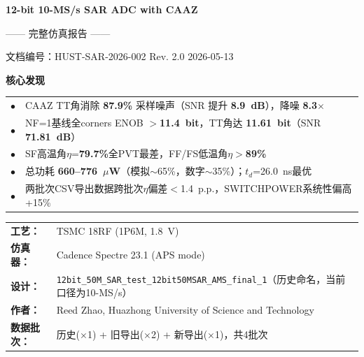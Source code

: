 \documentclass[11pt,a4paper,UTF8]{ctexart}
\begin{document}
\begin{titlepage}
\thispagestyle{empty}
\begin{center}
\vspace*{2cm}

{\LARGE\bfseries\color{primaryblue}12-bit 10-MS/s SAR ADC with CAAZ}

\vspace{0.3cm}
{\large —— 完整仿真报告 ——}

\vspace{1cm}

{\small 文档编号：HUST-SAR-2026-002 \hspace{2em} Rev. 2.0 \hspace{2em} 2026-05-13}

\vspace{1.5cm}

\begin{tcolorbox}[colback=accentblue,colframe=primaryblue,sharp corners]
\centering
\textbf{\large\color{primaryblue}核心发现}
\vspace{4pt}
\small
\begin{tabular}{ll}
\color{primaryblue}$\bullet$ & \color{black}CAAZ TT角消除 \textbf{87.9\%} 采样噪声（SNR 提升 \textbf{8.9~dB}），降噪 \textbf{8.3$\times$} \\
\color{primaryblue}$\bullet$ & \color{black}NF=1基线全corners ENOB $>$\textbf{11.4~bit}，TT角达 \textbf{11.61~bit}（SNR \textbf{71.81~dB}） \\
\color{primaryblue}$\bullet$ & \color{black}SF高温角$\eta$=\textbf{79.7\%}全PVT最差，FF/FS低温角$\eta>$\textbf{89\%} \\
\color{primaryblue}$\bullet$ & \color{black}总功耗 \textbf{660--776~$\mu$W}（模拟$\sim$65\%，数字$\sim$35\%）；$t_d$=26.0~ns最优 \\
\color{primaryblue}$\bullet$ & \color{black}两批次CSV导出数据跨批次$\eta$偏差$<$1.4~p.p.，SWITCHPOWER系统性偏高+15\% \\
\end{tabular}
\end{tcolorbox}

\vspace{1.5cm}

\begin{tabular}{ll}
\textbf{工艺：} & TSMC 18RF (1P6M, 1.8~V) \\
\textbf{仿真器：} & Cadence Spectre 23.1 (APS mode) \\
\textbf{设计：} & \texttt{12bit\_50M\_SAR\_test\_12bit50MSAR\_AMS\_final\_1}（历史命名，当前口径为10-MS/s） \\
\textbf{作者：} & Reed Zhao, Huazhong University of Science and Technology \\
\textbf{数据批次：} & 历史($\times$1) + 旧导出($\times$2) + 新导出($\times$1)，共4批次 \\
\end{tabular}


\end{center}
\end{titlepage}
\end{document}
